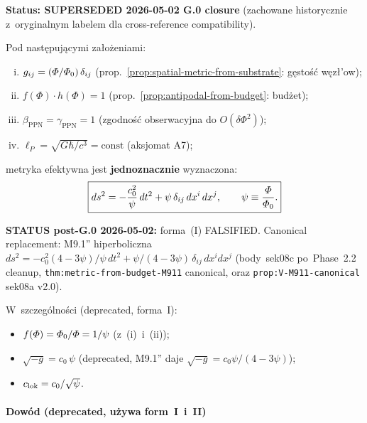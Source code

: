 \begin{theorem}%
\label{thm:metric-from-substrate-full}
\textbf{Status: SUPERSEDED 2026-05-02 G.0 closure} (zachowane historycznie
z~oryginalnym labelem dla cross-reference compatibility).

Pod nast\k{e}puj\k{a}cymi za\l{}o\.zeniami:
\begin{enumerate}[(i),nosep]
  \item $g_{ij} = (\varPhi/\varPhi_0)\,\delta_{ij}$
        (prop.~\ref{prop:spatial-metric-from-substrate}: g\k{e}sto\'s\'c
        w\k{e}z\l{}'ow);
  \item $f(\Phi)\cdot h(\Phi) = 1$
        (prop.~\ref{prop:antipodal-from-budget}: bud\.zet);
  \item $\beta_{\mathrm{PPN}} = \gamma_{\mathrm{PPN}} = 1$
        (zgodno\'s\'c obserwacyjna do $O(\delta\Phi^2)$);
  \item $\ell_P = \sqrt{G\hbar/c^3} = \text{const}$ (aksjomat A7);
\end{enumerate}
metryka efektywna jest \textbf{jednoznacznie} wyznaczona:
\begin{equation}\label{eq:metric-full-derived}
  \boxed{
    ds^2 = -\frac{c_0^2}{\psi}\,dt^2
         + \psi\,\delta_{ij}\,dx^i\,dx^j,
    \qquad \psi \equiv \frac{\varPhi}{\varPhi_0}.
  }
\end{equation}

\textbf{STATUS post-G.0 2026-05-02:} forma~(I) FALSIFIED. Canonical
replacement: M9.1'' hiperboliczna $ds^2 = -c_0^2(4-3\psi)/\psi\,dt^2
+ \psi/(4-3\psi)\,\delta_{ij}\,dx^i dx^j$ (body~sek08c po~Phase~2.2 cleanup,
\texttt{thm:metric-from-budget-M911} canonical, oraz
\texttt{prop:V-M911-canonical} sek08a v2.0).

W~szczeg\'olno\'sci (deprecated, forma~I):
\begin{itemize}[nosep]
  \item $f(\varPhi) = \varPhi_0/\varPhi = 1/\psi$ (z~(i)~i~(ii));
  \item $\sqrt{-g} = c_0\,\psi$ (deprecated, M9.1'' daje
        $\sqrt{-g}=c_0\psi/(4-3\psi)$);
  \item $c_{\rm lok} = c_0/\sqrt{\psi}$.
\end{itemize}
\end{theorem}

\paragraph{Dow\'od (deprecated, u\.zywa form~I~i~II)}

